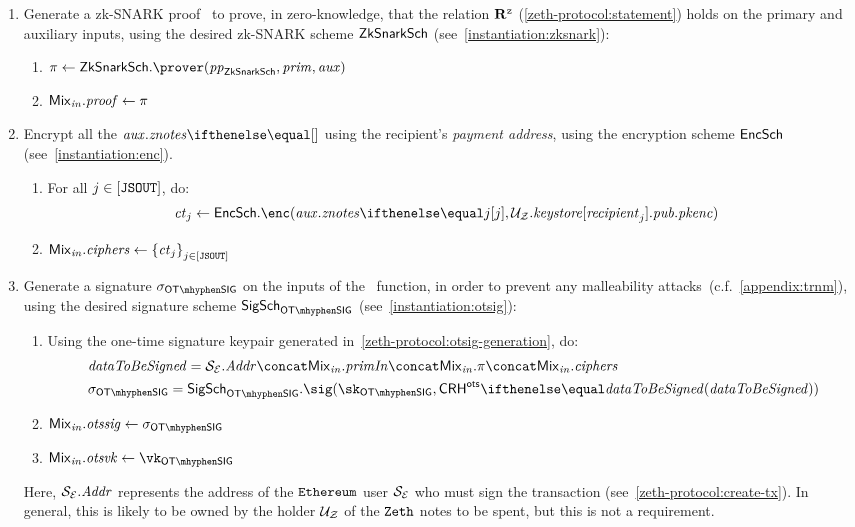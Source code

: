 \begin{enumerate}
\begin{notebox}
    \end{notebox}
\item Generate a zk-SNARK proof \zkp~to prove, in zero-knowledge, that the relation $\mathbf{R}^{\texttt{z}}$ (\cref{zeth-protocol:statement}) holds on the primary and auxiliary inputs, using the desired zk-SNARK scheme $\mathsf{ZkSnarkSch}$ (see~\cref{instantiation:zksnark}):
    \begin{enumerate}
        \item $\zkp \gets \zksnark.\prover(\pparams_{\zksnark}, \priminputs, \auxinputs)$
        \item $\mathit{{\mathsf{Mix}}_{in}}.\mathit{proof} \gets \mathit{\pi}$
    \end{enumerate}

\item Encrypt all the $\auxinputs.\znotes{}$ using the recipient's \emph{payment address}, using the encryption scheme $\mathsf{EncSch}$ (see~\cref{instantiation:enc}).
    \begin{enumerate}
        \item For all $j \in [\mathtt{JSOUT}]$, do:
        \begin{align*}
            & \ct_j \gets \encscheme.\enc(\auxinputs.\znotes{j}, \zparty{U}.\keystore[\varstyle{recipient}_j].\pubaddr.\pkenc)
        \end{align*}
        \item $\mathit{{\mathsf{Mix}}_{in}}.\mathit{ciphers} \gets \left\{{\mathit{ct}_j}\right\}_{j \in [\mathtt{JSOUT}]}$
    \end{enumerate}
\item Generate a signature $\otsSigma$ on the inputs of the \mix~function, in order to prevent any malleability attacks~(c.f.~\cref{appendix:trnm}), using the desired signature scheme $\otsigscheme$ (see~\cref{instantiation:otsig}):
    \begin{enumerate}
        \item Using the one-time signature keypair generated in~\cref{zeth-protocol:otsig-generation}, do:
            \begin{align*}
                & \datatobesigned = \eparty{S}.\addr \concat \inp{\mix}.\primInp \concat \inp{\mix}.\zkp \concat \inp{\mix}.\ciphers \\
                & \otsSigma = \otsigscheme.\sig(\sk_{\otsig}, \crhots{\datatobesigned})
            \end{align*}
        \item $\inp{\mix}.\otssig \gets \otsSigma$
        \item $\inp{\mix}.\otsvk \gets \vk_{\otsig}$
    \end{enumerate}
    Here, $\mathcal{{S}_{E}}.\mathit{Addr}$ represents the address of the $\texttt{Ethereum}{}$ user $\mathcal{{S}_{E}}$ who must sign the transaction (see~\cref{zeth-protocol:create-tx}). In general, this is likely to be owned by the holder $\mathcal{{U}_{Z}}$ of the $\texttt{Zeth}{}$ notes to be spent, but this is not a requirement.
\end{enumerate}
